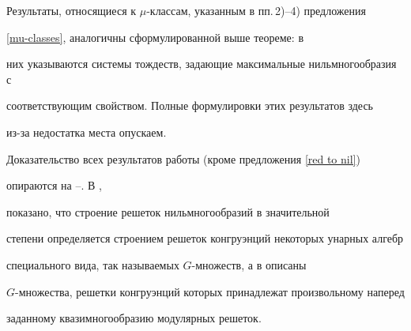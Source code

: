 

\medskip





Результаты, относящиеся к $\mu$-классам, указанным в пп.\,2)--4) предложения


\ref{mu-classes}, аналогичны сформулированной выше теореме: в


них указываются системы тождеств, задающие максимальные нильмногообразия с


соответствующим свойством. Полные формулировки этих результатов здесь


из-за недостатка места опускаем.





Доказательство всех результатов работы (кроме предложения \ref{red to nil})


опираются на \cite{VV98}--\cite{Ver97}. В \cite{VV98},


\cite{VV00b} показано, что строение решеток нильмногообразий в значительной


степени определяется строением решеток конгруэнций некоторых унарных алгебр


специального вида, так называемых $G$-множеств, а в \cite{Ver97} описаны


$G$-множества, решетки конгруэнций которых принадлежат произвольному наперед


заданному квазимногообразию модулярных решеток.








